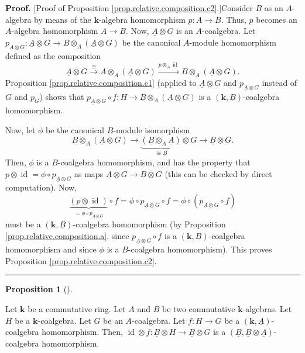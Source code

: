 \documentclass[numbers=enddot,12pt,final,onecolumn,notitlepage,abstracton]{scrartcl}%
\theoremstyle{definition}
\newtheorem{prop}[theo]{Proposition}
\newenvironment{proposition}[1][]
{\begin{prop}[#1]\begin{leftbar}}
{\end{leftbar}\end{prop}}
\newenvironment{proof}[1][Proof]{\noindent\textbf{#1.} }{\ \rule{0.5em}{0.5em}}
\begin{document}
\begin{proof}
[Proof of Proposition \ref{prop.relative.composition.c2}.]Consider $B$ as an
$A$-algebra by means of the $\mathbf{k}$-algebra homomorphism $p:A\rightarrow
B$. Thus, $p$ becomes an $A$-algebra homomorphism $A\rightarrow B$. Now,
$\underline{A}\otimes G$ is an $A$-coalgebra. Let $p_{\underline{A}\otimes
G}:\underline{A}\otimes G\rightarrow B\otimes_{A}\left(  \underline{A}\otimes
G\right)  $ be the canonical $A$-module homomorphism defined as the
composition%
\[
\underline{A}\otimes G\overset{\cong}{\longrightarrow}A\otimes_{A}\left(
\underline{A}\otimes G\right)  \overset{p\otimes_{A}\operatorname*{id}%
}{\longrightarrow}B\otimes_{A}\left(  \underline{A}\otimes G\right)  .
\]
Proposition \ref{prop.relative.composition.c1} (applied to $\underline{A}%
\otimes G$ and $p_{\underline{A}\otimes G}$ instead of $G$ and $p_{G}$) shows
that $p_{\underline{A}\otimes G}\circ f:H\rightarrow\underline{B}\otimes
_{A}\left(  \underline{A}\otimes G\right)  $ is a $\left(  \mathbf{k}%
,\underline{B}\right)  $-coalgebra homomorphism.

Now, let $\phi$ be the canonical $B$-module isomorphism
\[
\underline{B}\otimes_{A}\left(  \underline{A}\otimes G\right)  \rightarrow
\underbrace{\left(  \underline{B}\otimes_{A}\underline{A}\right)  }%
_{\cong\underline{B}}\otimes G\rightarrow\underline{B}\otimes G.
\]
Then, $\phi$ is a $B$-coalgebra homomorphism, and has the property that
$p\otimes\operatorname*{id}=\phi\circ p_{\underline{A}\otimes G}$ as maps
$\underline{A}\otimes G\rightarrow\underline{B}\otimes G$ (this can be checked
by direct computation). Now,%
\[
\underbrace{\left(  p\otimes\operatorname*{id}\right)  }_{=\phi\circ
p_{\underline{A}\otimes G}}\circ f=\phi\circ p_{\underline{A}\otimes G}\circ
f=\phi\circ\left(  p_{\underline{A}\otimes G}\circ f\right)
\]
must be a $\left(  \mathbf{k},\underline{B}\right)  $-coalgebra homomorphism
(by Proposition \ref{prop.relative.composition.a}, since $p_{\underline{A}%
\otimes G}\circ f$ is a $\left(  \mathbf{k},\underline{B}\right)  $-coalgebra
homomorphism and since $\phi$ is a $B$-coalgebra homomorphism). This proves
Proposition \ref{prop.relative.composition.c2}.
\end{proof}

\begin{proposition}
\label{prop.relative.composition.d}Let $\mathbf{k}$ be a commutative ring. Let
$A$ and $B$ be two commutative $\mathbf{k}$-algebras. Let $H$ be a
$\mathbf{k}$-coalgebra. Let $G$ be an $A$-coalgebra. Let $f:H\rightarrow G$ be
a $\left(  \mathbf{k},\underline{A}\right)  $-coalgebra homomorphism. Then,
$\operatorname*{id}\otimes f:\underline{B}\otimes H\rightarrow\underline{B}%
\otimes G$ is a $\left(  \underline{B},\underline{B}\otimes\underline{A}%
\right)  $-coalgebra homomorphism.
\end{proposition}
\end{document}
